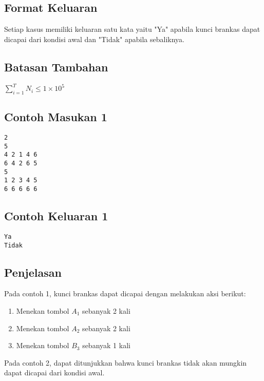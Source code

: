 \documentclass{article}
\begin{document}
\subsection*{Format Keluaran}

Setiap kasus memiliki keluaran satu kata yaitu "Ya" apabila kunci brankas dapat dicapai dari kondisi awal dan "Tidak" apabila sebaliknya.

\subsection*{Batasan Tambahan}
$\sum_{i=1}^T N_i \leq 1 \times 10^{5}$

\begin{multicols}{2}
\subsection*{Contoh Masukan 1}
\begin{lstlisting}
2
5
4 2 1 4 6
6 4 2 6 5
5
1 2 3 4 5
6 6 6 6 6
\end{lstlisting}
\columnbreak
\subsection*{Contoh Keluaran 1}
\begin{lstlisting}
Ya
Tidak
\end{lstlisting}
\vfill
\null
\end{multicols}


\subsection*{Penjelasan}

Pada contoh 1, kunci brankas dapat dicapai dengan melakukan aksi berikut:

\begin{enumerate}
\item Menekan tombol $A_1$ sebanyak 2 kali
\item Menekan tombol $A_2$ sebanyak 2 kali
\item Menekan tombol $B_3$ sebanyak 1 kali
\end{enumerate}

Pada contoh 2, dapat ditunjukkan bahwa kunci brankas tidak akan mungkin dapat dicapai dari kondisi awal.
\end{document}
